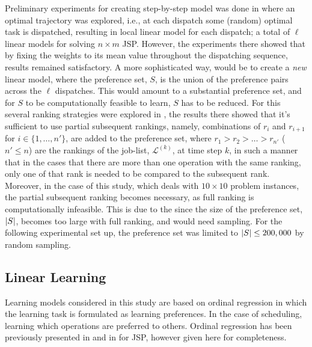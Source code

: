 \documentclass[smallextended]{svjour3}
\begin{document}
Preliminary experiments for creating step-by-step model was done in 
\cite{InRu11a} where an optimal trajectory was explored, i.e., at each dispatch 
some (random) optimal task is dispatched, resulting in local linear model for 
each dispatch; a total of $\ell$ linear models for solving $n\times m$ JSP. 
However, the experiments there showed that by fixing the weights to its mean 
value throughout the dispatching sequence, results remained satisfactory.
A more sophisticated way, would be to create a \emph{new} linear model, where 
the preference set, $S$, is the union of the preference pairs across the $\ell$ 
dispatches. This would amount to a substantial preference set, and for $S$ to 
be 
computationally feasible to learn, $S$ has to be reduced. For this several 
ranking strategies were explored in \cite{InRu14b}, the results there showed 
that it's sufficient to use partial subsequent rankings, namely, combinations 
of $r_i$ and $r_{i+1}$ for $i\in\{1,\ldots,n'\}$, are added to the preference 
set, where $r_1>r_2>\ldots>r_{n'}$ ($n'\leq n$) are the rankings of the 
job-list, $\mathcal{L}^{(k)}$, at time step $k$, in such a manner that in the 
cases that there are more than one operation with the same ranking, only one of 
that rank is needed to be compared to the subsequent rank. Moreover, in the 
case of this study, which deals with $10\times 10$ problem instances, the 
partial subsequent ranking becomes necessary, as full ranking is 
computationally infeasible. This is due to the since the size of the preference 
set, $\lvert S\rvert$, becomes too large with full ranking, and would need sampling.
For the following experimental set up, the preference set was limited to 
$\lvert S\rvert\leq200,000$ by random sampling.

\subsection{Linear Learning}

Learning models considered in this study are based on ordinal regression in 
which the learning task is formulated as learning preferences. In the case of 
scheduling, learning which operations are preferred to others. Ordinal 
regression has been previously presented in \cite{Ru06:PPSN} and in 
\cite{InRu11a} for JSP, however given here for completeness. 
\end{document}
